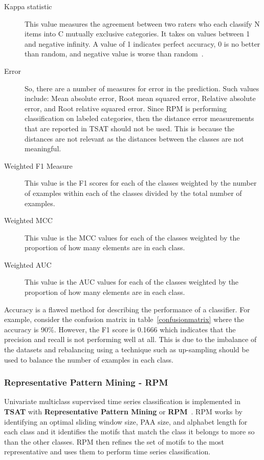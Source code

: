 \documentclass[titlepage, letterpaper, 12pt]{article}
\newcommand\TSAT{\textbf{TSAT}}
\begin{document}
\begin{description}
	\item[Kappa statistic] This value measures the agreement between two raters who each classify N items into C mutually exclusive categories. It takes on values between 1 and negative infinity.  A value of 1 indicates perfect accuracy, 0 is no better than random, and negative value is worse than random~\cite{KAPPA}.
	\item[Error] So, there are a number of measures for error in the prediction.  Such values include: Mean absolute error, Root mean squared error, Relative absolute error, and Root relative squared error.  Since RPM is performing classification on labeled categories, then the distance error measurements that are reported in TSAT should not be used.  This is because the distances are not relevant as the distances between the classes are not meaningful.  
	\item[Weighted F1 Measure]  This value is the F1 scores for each of the classes weighted by the number of examples within each of the classes divided by the total number of examples.
	\item[Weighted MCC]  This value is the MCC values for each of the classes weighted by the proportion of how many elements are in each class.
	\item[Weighted AUC] This value is the AUC values for each of the classes weighted by the proportion of how many elements are in each class. 

	
\end{description}

Accuracy is a flawed method for describing the performance of a classifier.  For example, consider the confusion matrix in table~\ref{confusionmatrix} where the accuracy is 90\%.  However, the F1 score is 0.1666 which indicates that the precision and recall is not performing well at all.  This is due to the imbalance of the datasets and rebalancing using a technique such as up-sampling should be used to balance the number of examples in each class.

\subsubsection{Representative Pattern Mining - RPM}
\label{RPMOverview}

Univariate multiclass supervised time series classification is implemented in {\TSAT} with \textbf{Representative Pattern Mining} or \textbf{RPM}~\cite{wang2016rpm}.  RPM works by identifying an optimal sliding window size, PAA size, and alphabet length for each class and it identifies the motifs that match the class it belongs to more so than the other classes.  RPM then refines the set of motifs to the most representative and uses them to perform time series classification.
\end{document}
